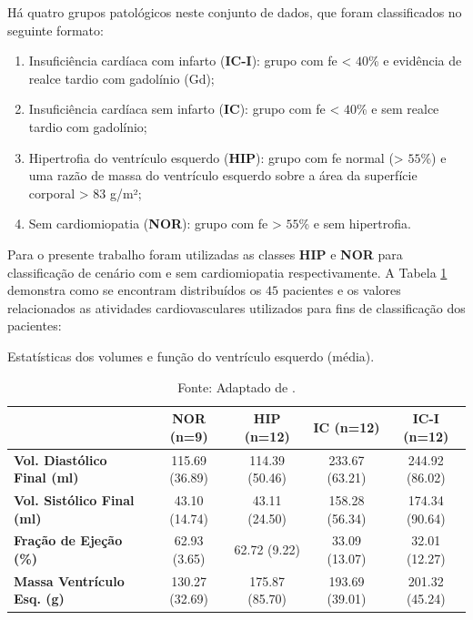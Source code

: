 Há quatro grupos patológicos neste conjunto de dados, que foram classificados no seguinte formato:

\begin{enumerate}
    \item Insuficiência cardíaca com infarto (\textbf{IC-I}): grupo com \gls{fe} < $40$\% e evidência de realce tardio com gadolínio (Gd);
    \item Insuficiência cardíaca sem infarto (\textbf{IC}): grupo com \gls{fe} < $40$\% e sem realce tardio com gadolínio;
    \item Hipertrofia do ventrículo esquerdo (\textbf{HIP}): grupo com \gls{fe} normal (> $55$\%) e uma razão de massa do ventrículo esquerdo sobre a área da superfície corporal > $83$ g/m²;
    \item Sem cardiomiopatia (\textbf{NOR}): grupo com \gls{fe} > $55$\% e sem hipertrofia.
\end{enumerate}

\noindent Para o presente trabalho foram utilizadas as classes \textbf{HIP} e \textbf{NOR} para classificação de cenário com e sem cardiomiopatia respectivamente. A Tabela \ref{tab:sunny_stats} demonstra como se encontram distribuídos os $45$ pacientes e os valores relacionados as atividades cardiovasculares utilizados para fins de classificação dos pacientes:
\newline

\begin{table}[h!]
\centering
\caption{Estatísticas dos volumes e função do ventrículo esquerdo (média).}
\begin{tabular}{@{}lcccc@{}}
\toprule
\textbf{}  & \textbf{NOR (n=9)} & \textbf{HIP (n=12)} & \textbf{IC (n=12)} & \textbf{IC-I (n=12)} \\ \midrule
\textbf{Vol. Diastólico Final (ml)} & 115.69 (36.89)   & 114.39 (50.46)      & 233.67 (63.21)     & 244.92 (86.02)       \\
\textbf{Vol. Sistólico Final (ml)}  & 43.10 (14.74)    & 43.11 (24.50)       & 158.28 (56.34)     & 174.34 (90.64)       \\
\textbf{Fração de Ejeção (\%)}        & 62.93 (3.65)     & 62.72 (9.22)        & 33.09 (13.07)      & 32.01 (12.27)        \\
\textbf{Massa Ventrículo Esq. (g)} & 130.27 (32.69)   & 175.87 (85.70)      & 193.69 (39.01)     & 201.32 (45.24)       \\ \bottomrule
\end{tabular}
\caption*{Fonte: Adaptado de \cite{radauEvaluationFrameworkAlgorithms2009}.}
\label{tab:sunny_stats}
\end{table}

